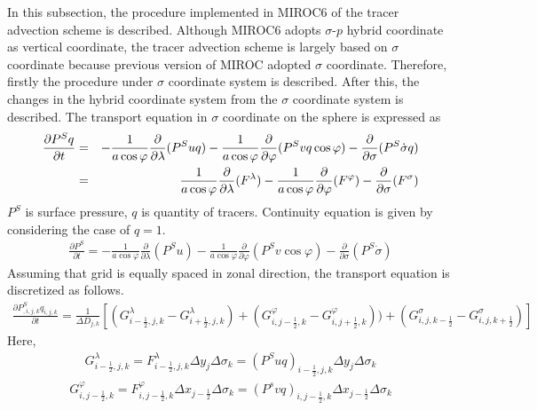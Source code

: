 In this subsection, the procedure implemented in MIROC6 of the tracer advection scheme is described. Although MIROC6 adopts \(\sigma\)-\(p\) hybrid coordinate as vertical coordinate, the tracer
advection scheme is largely based on \(\sigma\) coordinate because previous version of MIROC adopted \(\sigma\) coordinate. Therefore, firstly the procedure under \(\sigma\) coordinate system is
described. After this, the changes in the hybrid coordinate system from the \(\sigma\) coordinate system is described. The transport equation in \(\sigma\) coordinate on the sphere is expressed as
\begin{eqnarray}\begin{aligned}
  \label{b1}
  \frac{\partial P^{S} q}{\partial t} &=& - \frac{1}{a \cos \varphi} \frac{\partial}{\partial \lambda}(P^{S} uq)- \frac{1}{a \cos \varphi} \frac{\partial}{\partial \varphi}(P^{S} vq \cos \varphi)- \frac{\partial}{\partial \sigma} (P^{S} \dot{\sigma} q)\notag\\
  &=& \frac{1}{a \cos \varphi} \frac{\partial}{\partial \lambda}(F^{\lambda})- \frac{1}{a \cos \varphi} \frac{\partial}{\partial \varphi}(F^{\varphi})- \frac{\partial}{\partial \sigma} (F^{\sigma})\end{aligned}\end{eqnarray}
\(P^{S}\) is surface pressure, \(q\) is quantity of tracers. Continuity equation is given by considering the case of \(q=1\).
\begin{eqnarray}\frac{\partial P^{S}}{\partial t} = - \frac{1}{a \cos \varphi} \frac{\partial}{\partial \lambda}(P^{S}u)- \frac{1}{a \cos \varphi} \frac{\partial}{\partial \varphi}(P^{S}v \cos \varphi)- \frac{\partial}{\partial \sigma} (P^{S} \dot{\sigma})\end{eqnarray}
Assuming that grid is equally spaced in zonal direction, the transport equation is discretized as follows. \begin{eqnarray}\label{a1}
  \frac{\partial P^{S}_{,i,j,k} q_{i,j,k}}{\partial t}=\frac{1}{\Delta D_{j,k}}[(G^{\lambda}_{i-\frac{1}{2},j,k}-G^{\lambda}_{i+\frac{1}{2},j,k})+(G^{\varphi}_{i,j-\frac{1}{2},k}-G^{\varphi}_{i,j+\frac{1}{2},k}))+(G^{\sigma}_{i,j,k-\frac{1}{2}}-G^{\sigma}_{i,j,k+\frac{1}{2}})]\end{eqnarray}
Here, \begin{eqnarray}G^{\lambda}_{i-\frac{1}{2},j,k}=F^{\lambda}_{i-\frac{1}{2},j,k} \Delta y_{j} \Delta \sigma_{k}=(P^{S}uq)_{i-\frac{1}{2},j,k} \Delta y_{j} \Delta \sigma_{k}\end{eqnarray}
\begin{eqnarray}G^{\varphi}_{i,j-\frac{1}{2},k}=F^{\varphi}_{i,j-\frac{1}{2},k} \Delta x_{j-\frac{1}{2}} \Delta \sigma_{k}=(P^{s}vq)_{i,j-\frac{1}{2},k} \Delta x_{j-\frac{1}{2}} \Delta \sigma_{k}\end{eqnarray}
